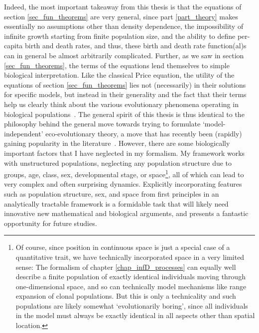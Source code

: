 Indeed, the most important takeaway from this thesis is that the equations of section \ref{sec_fun_theorems} are very general, since part \ref{part_theory} makes essentially no assumptions other than density dependence, the impossibility of infinite growth starting from finite population size, and the ability to define per-capita birth and death rates, and thus, these birth and death rate function(al)s can in general be almost arbitrarily complicated. Further, as we saw in section \ref{sec_fun_theorems}, the terms of the equations lend themselves to simple biological interpretation. Like the classical Price equation, the utility of the equations of section \ref{sec_fun_theorems} lies not (necessarily) in their solutions for specific models, but instead in their generality and the fact that their terms help us clearly think about the various evolutionary phenomena operating in biological populations~\citep{frank_natural_2012,luque_one_2017, luque_mirror_2021}. The general spirit of this thesis is thus identical to the philosophy behind the general move towards trying to formulate `model-independent' eco-evolutionary theory, a move that has recently been (rapidly) gaining popularity in the literature~\citep{grafen_formal_2014, queller_fundamental_2017, lion_theoretical_2018, allen_mathematical_2019, rice_universal_2020, week_white_2021, wickman_theoretical_2022, kuosmanen_turnover_2022, mazzolini_universality_2022,lion_extending_2023,allen_natural_2023}. However, there are some biologically important factors that I have neglected in my formalism. My framework works with unstructured populations, neglecting any population structure due to groups, age, class, sex, developmental stage, or space\footnote{Of course,  since position in continuous space is just a special case of a quantitative trait, we have technically incorporated space in a very limited sense: The formalism of chapter \ref{chap_infD_processes} can equally well describe a finite population of exactly identical individuals moving through one-dimensional space, and so can technically model mechanisms like range expansion of clonal populations. But this is only a technicality and such populations are likely somewhat `evolutionarily boring', since all individuals in the model must always be exactly identical in all aspects other than spatial location.}, all of which can lead to very complex and often surprising dynamics. Explicitly incorporating features such as population structure, sex, and space from first principles in an analytically tractable framework is a formidable task that will likely need innovative new mathematical and biological arguments, and presents a fantastic opportunity for future studies.

